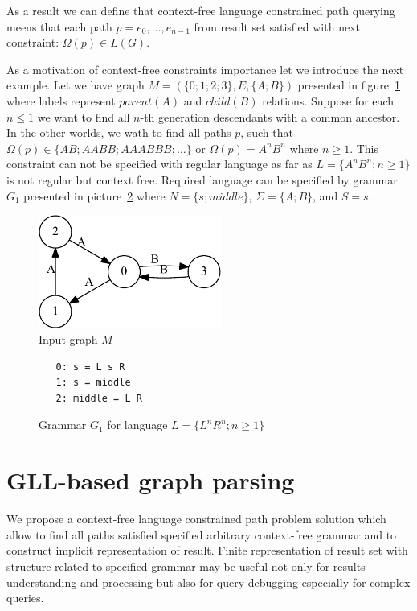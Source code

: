 \documentclass{sig-alternate} %
\begin{document}
As a result we can define that context-free language constrained path querying meens that each path $p = e_0,\dots,e_{n-1}$ from result set satisfied with next constraint: $\Omega(p) \in L(G)$. 

As a motivation of context-free constraints importance let we introduce the next example.
Let we have graph $M=(\{0;1;2;3\},E,\{A;B\})$ presented in figure~\ref{input} where labels represent $parent (A)$ and $child (B)$ relations. 
Suppose for each $n \leq 1$ we want to find all $n$-th generation descendants with a common ancestor.
In the other worlds, we wath to find all paths $p$, such that $\Omega(p) \in \{AB; AABB; AAABBB; \dots\}$ or $\Omega(p) = A^n B^n$ where $n \geq 1$.
This constraint can not be specified with regular language as far as $L=\{A^n B^n; n \geq 1\}$ is not regular but context free.
Required language can be specified by grammar $G_1$ presented in picture~\ref{grammarG} where $N = \{s; middle\}$, $\Sigma = \{A; B\}$, and $S = s$.

\begin{figure}[h]
    \begin{center}
        \includegraphics[width=6cm]{dot/input.pdf}
        \caption{Input graph $M$}
        \label{input}        
    \end{center}
\end{figure}

\begin{figure}[h]
   \begin{center}
\begin{verbatim}
   0: s = L s R 
   1: s = middle
   2: middle = L R
\end{verbatim}
   \caption{Grammar $G_1$ for language $L=\{L^n R^n; n \geq 1\}$}
   \label{grammarG}        
   \end{center}
\end{figure}

\section{GLL-based graph parsing}
We propose a context-free language constrained path problem solution which allow to find all paths satisfied specified arbitrary context-free grammar and to construct implicit representation of result. 
Finite representation of result set with structure related to specified grammar may be useful not only for results understanding and processing but also for query debugging especially for complex queries. 
\end{document}
